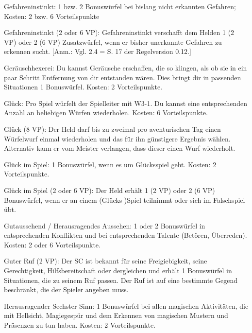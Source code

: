 \begin{description}
\item{Gefahreninstinkt:} 1 bzw. 2 Bonuswürfel bei bislang nicht erkannten Gefahren; Kosten: 2 bzw. 6 Vorteilspunkte

\item{Gefahreninstinkt (2 oder 6 VP):} Gefahreninstinkt verschafft dem Helden 1 (2 VP) oder 2 (6 VP) Zusatzwürfel, wenn er bisher unerkannte Gefahren zu erkennen sucht. [Anm.: Vgl. 2.4 = S. 17 der Regelversion 0.12.]

\item{Geräuschhexerei:} Du kannst Geräusche erschaffen, die so klingen, als ob sie in ein paar Schritt Entfernung von dir entstanden wären. Dies bringt dir in passenden Situationen 1 Bonuswürfel. Kosten: 2 Vorteilspunkte.

\item{Glück:} Pro Spiel würfelt der Spielleiter mit W3-1. Du kannst eine entsprechenden Anzahl an beliebigen Würfen wiederholen. Kosten: 6 Vorteilspunkte.

\item{Glück (8 VP):} Der Held darf bis zu zweimal pro aventurischen Tag einen Würfelwurf einmal wiederholen und das für ihn günstigere Ergebnis wählen. Alternativ kann er vom Meister verlangen, dass dieser einen Wurf wiederholt.

\item{Glück im Spiel:} 1 Bonuswürfel, wenn es um Glücksspiel geht. Kosten: 2 Vorteilspunkte.

\item{Glück im Spiel (2 oder 6 VP):} Der Held erhält 1 (2 VP) oder 2 (6 VP) Bonuswürfel, wenn er an einem (Glücks-)Spiel teilnimmt oder sich im Falschspiel übt.

\item{Gutaussehend / Herausragendes Aussehen:} 1 oder 2 Bonuswürfel in entsprechenden Konflikten und bei entsprechenden Talente (Betören, Überreden). Kosten: 2 oder 6 Vorteilspunkte.

\item{Guter Ruf (2 VP):}
Der SC ist bekannt für seine Freigiebigkeit, seine Gerechtigkeit, Hilfsbereitschaft oder dergleichen und erhält 1 Bonuswürfel in Situationen, die zu seinem Ruf passen. Der Ruf ist auf eine bestimmte Gegend beschränkt, die der Spieler angeben muss.

\item{Herausragender Sechster Sinn:} 1 Bonuswürfel bei allen magischen Aktivitäten, die mit Hellsicht, Magiegespür und dem Erkennen von magischen Mustern und Präsenzen zu tun haben. Kosten: 2 Vorteilspunkte.


\end{description}

